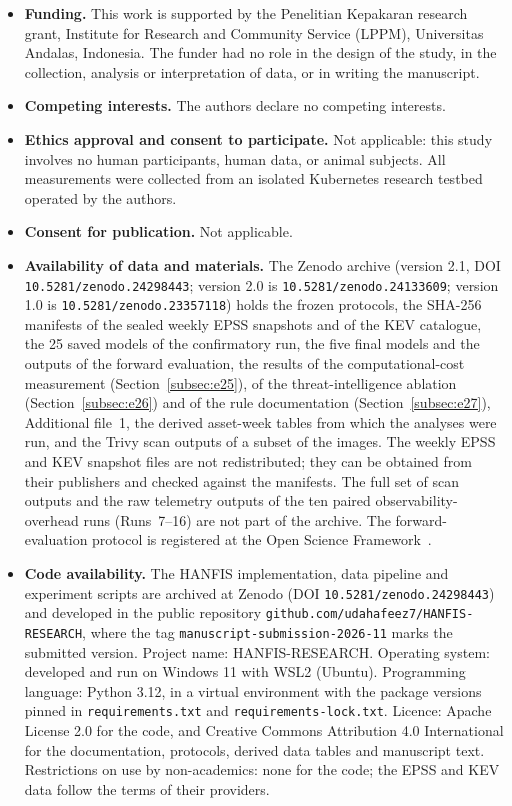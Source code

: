 \documentclass[referee,lineno,pdflatex,sn-basic]{sn-jnl}%
\theoremstyle{thmstyleone}%
\theoremstyle{thmstyletwo}%
\theoremstyle{thmstylethree}%
\begin{document}
\begin{itemize}
\item \textbf{Funding.} This work is supported by the Penelitian Kepakaran research grant, Institute for Research and Community Service (LPPM), Universitas Andalas, Indonesia. The funder had no role in the design of the study, in the collection, analysis or interpretation of data, or in writing the manuscript.
\item \textbf{Competing interests.} The authors declare no competing interests.
\item \textbf{Ethics approval and consent to participate.} Not applicable: this study involves no human participants, human data, or animal subjects. All measurements were collected from an isolated Kubernetes research testbed operated by the authors.
\item \textbf{Consent for publication.} Not applicable.
\item \textbf{Availability of data and materials.} The Zenodo archive (version 2.1, DOI \texttt{10.5281/zenodo.24298443}; version 2.0 is \texttt{10.5281/zenodo.24133609}; version 1.0 is \texttt{10.5281/zenodo.23357118}) holds the frozen protocols, the SHA-256 manifests of the sealed weekly EPSS snapshots and of the KEV catalogue, the 25 saved models of the confirmatory run, the five final models and the outputs of the forward evaluation, the results of the computational-cost measurement (Section~\ref{subsec:e25}), of the threat-intelligence ablation (Section~\ref{subsec:e26}) and of the rule documentation (Section~\ref{subsec:e27}), Additional file~1, the derived asset-week tables from which the analyses were run, and the Trivy scan outputs of a subset of the images. The weekly EPSS and KEV snapshot files are not redistributed; they can be obtained from their publishers and checked against the manifests. The full set of scan outputs and the raw telemetry outputs of the ten paired observability-overhead runs (Runs~7--16) are not part of the archive. The forward-evaluation protocol is registered at the Open Science Framework~\citep{osf_ahcvs}.
\item \textbf{Code availability.} The HANFIS implementation, data pipeline and experiment scripts are archived at Zenodo (DOI \texttt{10.5281/zenodo.24298443}) and developed in the public repository \texttt{github.com/udahafeez7/HANFIS-RESEARCH}, where the tag \texttt{manuscript-submission-2026-11} marks the submitted version. Project name: HANFIS-RESEARCH. Operating system: developed and run on Windows 11 with WSL2 (Ubuntu). Programming language: Python 3.12, in a virtual environment with the package versions pinned in \texttt{requirements.txt} and \texttt{requirements-lock.txt}. Licence: Apache License 2.0 for the code, and Creative Commons Attribution 4.0 International for the documentation, protocols, derived data tables and manuscript text. Restrictions on use by non-academics: none for the code; the EPSS and KEV data follow the terms of their providers.

\end{itemize}
\end{document}

